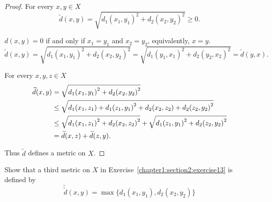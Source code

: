 \begin{proof}
    For every $x, y\in X$
    \[
        \widetilde{d}(x, y) = \sqrt{{d_{1}(x_{1}, y_{1})}^{2} + {d_{2}(x_{2}, y_{2})}^{2}} \geq 0.
    \]

    $d(x, y) = 0$ if and only if $x_{1} = y_{1}$ and $x_{2} = y_{2}$, equivalently, $x = y$.
    \[
        \widetilde{d}(x, y) = \sqrt{{d_{1}(x_{1}, y_{1})}^{2} + {d_{2}(x_{2}, y_{2})}^{2}} = \sqrt{{d_{1}(y_{1}, x_{1})}^{2} + {d_{2}(y_{2}, x_{2})}^{2}} = \widetilde{d}(y, x).
    \]

    For every $x, y, z\in X$
    \begin{align*}
        \widetilde{d}(x, y) & = \sqrt{{d_{1}(x_{1}, y_{1})}^{2} + {d_{2}(x_{2}, y_{2})}^{2}}                                                                   \\
                            & \leq \sqrt{{d_{1}(x_{1}, z_{1}) + d_{1}(z_{1}, y_{1})}^{2} + {d_{2}(x_{2}, z_{2}) + d_{2}(z_{2}, y_{2})}^{2}}                    \\
                            & \leq \sqrt{{d_{1}(x_{1}, z_{1})}^{2} + {d_{2}(x_{2}, z_{2})}^{2}} + \sqrt{{d_{1}(z_{1}, y_{1})}^{2} + {d_{2}(z_{2}, y_{2})}^{2}} \\
                            & = \widetilde{d}(x, z) + \widetilde{d}(z, y). \qedhere
    \end{align*}

    Thus $\widetilde{d}$ defines a metric on $X$.
\end{proof}

\begin{exercise}\label{chapter1:section2:exercise15}
    Show that a third metric on $X$ in Exercise~\ref{chapter1:section2:exercise13} is defined by
    \[
        \widetilde{\widetilde{d}}(x, y) = \max \{d_{1}(x_{1}, y_{1}), d_{2}(x_{2}, y_{2})\}
    \]
\end{exercise}

